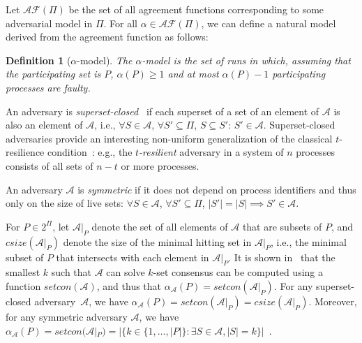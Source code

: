 \documentclass[a4paper]{article}
\newtheorem{theorem}{Theorem}
\newtheorem{definition}{Definition}
\def\A{\ensuremath{\mathcal{A}}}
\def\HSS{\mathit{csize}}
\newcommand{\setcon}{\mathit{setcon}}
\begin{document}
Let $\mathcal{AF}(\Pi)$ be the set of all agreement functions 
corresponding to some adversarial model in $\Pi$. 
For all $\alpha\in\mathcal{AF}(\Pi)$, we can define a natural model
derived from the agreement function as follows:
\begin{definition}[$\alpha$-model] 
  The \emph{$\alpha$-model} is the set of
  runs in which, assuming that the participating set is $P$,
  $\alpha(P)\geq 1$ and  at most $\alpha(P)-1$ participating processes are faulty.
\end{definition}

%

An adversary is \emph{superset-closed}~\cite{Kuz12} if each superset of a set of an
element of $\A$ is also an element of $\A$, i.e.,
$\forall S\in \A$, $\forall S'\subseteq \Pi$, $S\subseteq S'$: $S'\in\A$. 
Superset-closed adversaries provide an interesting non-uniform
generalization of the classical $t$-resilience condition~\cite{HR10}:
e.g., the \emph{$t$-resilient} adversary in a
system of $n$ processes consists of all sets of $n-t$ or more processes.

%


An adversary $\A$ is \emph{symmetric} if it does not depend on process
identifiers and thus only on the size of live sets: 
$\forall S \in \A$, $\forall S' \subseteq \Pi$, $|S'|=|S|\implies S'\in\A$.

%
For  $P\in 2^{\Pi}$, let $\A|_P$ denote the set of all elements of
$\A$ that are subsets of $P$, and $\HSS(\A|_P)$ denote the size of the
minimal hitting set in $\A|_P$, i.e., the minimal subset of $P$ that
intersects with each element in $\A|_P$.  
It is shown in~\cite{GK10} that the smallest $k$ such that $\A$ 
can solve $k$-set consensus can be computed using a function $\setcon(\A)$,
and thus that $\alpha_{\A}(P)=\setcon(\A|_P)$.
For any superset-closed adversary~$\A$, we have
$\alpha_{\A}(P) = \setcon(\A|_P) = \HSS(\A|_P)$.
Moreover, for any symmetric adversary $\A$, we have
$\alpha_{\A}(P)= \setcon(\A|_P) = |\{k\in\{1,\ldots,|P|\}: \exists S \in \A, |S|=k\}|$~\cite{GK10}.
\end{document}
